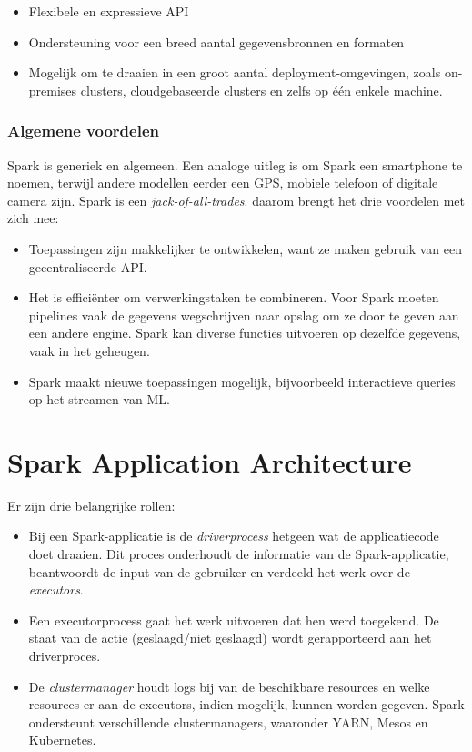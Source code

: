 \documentclass[a4paper,10pt,twoside]{report}
\begin{document}
\begin{itemize}
	\item Flexibele en expressieve API
	\item Ondersteuning voor een breed aantal gegevensbronnen en formaten
	\item Mogelijk om te draaien in een groot aantal deployment-omgevingen, zoals on-premises clusters, cloudgebaseerde clusters en zelfs op één enkele machine.
\end{itemize}

\subsubsection{Algemene voordelen}

Spark is generiek en algemeen. Een analoge uitleg is om Spark een smartphone te noemen, terwijl andere modellen eerder een GPS, mobiele telefoon of digitale camera zijn. Spark is een \textit{jack-of-all-trades}. daarom brengt het drie voordelen met zich mee:

\begin{itemize}
	\item Toepassingen zijn makkelijker te ontwikkelen, want ze maken gebruik van een gecentraliseerde API.
	\item Het is efficiënter om verwerkingstaken te combineren. Voor Spark moeten pipelines vaak de gegevens wegschrijven naar opslag om ze door te geven aan een andere engine. Spark kan diverse functies uitvoeren op dezelfde gegevens, vaak in het geheugen.
	\item Spark maakt nieuwe toepassingen mogelijk, bijvoorbeeld interactieve queries op het streamen van ML.
\end{itemize}

\section{Spark Application Architecture}

Er zijn drie belangrijke rollen:

\begin{itemize}
	\item Bij een Spark-applicatie is de \textit{driverprocess} hetgeen wat de applicatiecode doet draaien. Dit proces onderhoudt de informatie van de Spark-applicatie, beantwoordt de input van de gebruiker en verdeeld het werk over de \textit{executors}.
	\item Een executorprocess gaat het werk uitvoeren dat hen werd toegekend. De staat van de actie (geslaagd/niet geslaagd) wordt gerapporteerd aan het driverproces.
	\item De \textit{clustermanager} houdt logs bij van de beschikbare resources en welke resources er aan de executors, indien mogelijk, kunnen worden gegeven. Spark ondersteunt verschillende clustermanagers, waaronder YARN, Mesos en Kubernetes.
\end{itemize}
\end{document}
